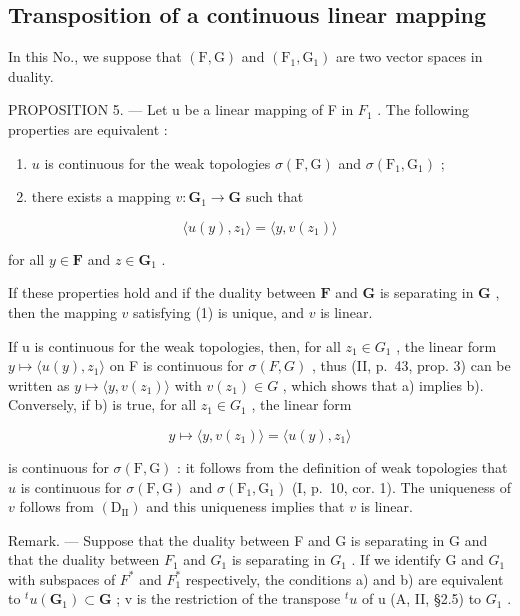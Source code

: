 \subsection{Transposition of a continuous linear mapping}

In this No., we suppose that \((\mathrm{F},\mathrm{G})\) and \((\mathrm{F}_1,\mathrm{G}_1)\) are two vector spaces in duality.

PROPOSITION 5. --- Let u be a linear mapping of F in \(F_{1}\) . The following properties are equivalent :

\begin{enumerate}
\def\labelenumi{\alph{enumi})}
\item
  \(u\) is continuous for the weak topologies \(\sigma (\mathrm{F},\mathrm{G})\) and \(\sigma (\mathrm{F}_1,\mathrm{G}_1)\) ;
\item
  there exists a mapping \(v: \mathbf{G}_1 \to \mathbf{G}\) such that
\end{enumerate}

\[
\langle u (y), z _ {1} \rangle = \langle y, v (z _ {1}) \rangle\tag{1}
\]

for all \(y \in \mathbf{F}\) and \(z \in \mathbf{G}_1\) .

If these properties hold and if the duality between \(\mathbf{F}\) and \(\mathbf{G}\) is separating in \(\mathbf{G}\) , then the mapping \(v\) satisfying (1) is unique, and \(v\) is linear.

If u is continuous for the weak topologies, then, for all \(z_{1} \in G_{1}\) , the linear form \(y \mapsto \langle u(y), z_{1} \rangle\) on F is continuous for \(\sigma(F, G)\) , thus (II, p.~43, prop. 3) can be written as \(y \mapsto \langle y, v(z_{1}) \rangle\) with \(v(z_{1}) \in G\) , which shows that a) implies b). Conversely, if b) is true, for all \(z_{1} \in G_{1}\) , the linear form

\[
y \mapsto \langle y, v (z _ {1}) \rangle = \langle u (y), z _ {1} \rangle
\]

is continuous for \(\sigma(\mathrm{F},\mathrm{G})\) : it follows from the definition of weak topologies that \(u\) is continuous for \(\sigma(\mathrm{F},\mathrm{G})\) and \(\sigma(\mathrm{F}_1,\mathrm{G}_1)\) (I, p.~10, cor. 1). The uniqueness of \(v\) follows from \((\mathrm{D}_{\mathrm{II}})\) and this uniqueness implies that \(v\) is linear.

Remark. --- Suppose that the duality between F and G is separating in G and that the duality between \(F_{1}\) and \(G_{1}\) is separating in \(G_{1}\) . If we identify G and \(G_{1}\) with subspaces of \(F^{*}\) and \(F_{1}^{*}\) respectively, the conditions a) and b) are equivalent to \(^{t}u(\mathbf{G}_{1}) \subset \mathbf{G}\) ; v is the restriction of the transpose \(^{t}u\) of u (A, II, §2.5) to \(G_{1}\) .

